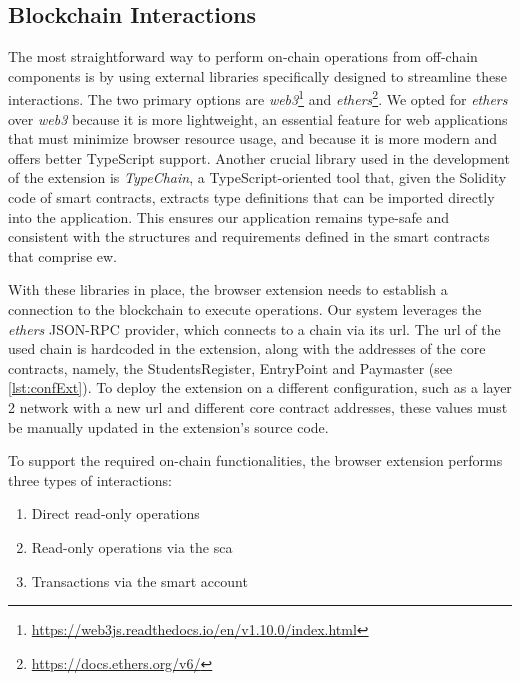 \subsection{Blockchain Interactions}
\label{ssec:extBlockchainInteraction}
The most straightforward way to perform on-chain operations from off-chain components is by using external libraries specifically designed to streamline these interactions. The two primary options are \textit{web3}\footnote{\url{https://web3js.readthedocs.io/en/v1.10.0/index.html}} and \textit{ethers}\footnote{\url{https://docs.ethers.org/v6/}}. We opted for \textit{ethers} over \textit{web3} because it is more lightweight, an essential feature for web applications that must minimize browser resource usage, and because it is more modern and offers better TypeScript support. 
Another crucial library used in the development of the extension is \textit{TypeChain}, a TypeScript-oriented tool that, given the Solidity code of smart contracts, extracts type definitions that can be imported directly into the application. This ensures our application remains type-safe and consistent with the structures and requirements defined in the smart contracts that comprise \acrlong{ew}. 

With these libraries in place, the browser extension needs to establish a connection to the blockchain to execute operations. Our system leverages the \textit{ethers} JSON-RPC provider, which connects to a chain via its \acrshort{url}. The \acrshort{url} of the used chain is hardcoded in the extension, along with the addresses of the core contracts, namely, the StudentsRegister, EntryPoint and Paymaster (see \cref{lst:confExt}). To deploy the extension on a different configuration, such as a layer 2 network with a new \acrshort{url} and different core contract addresses, these values must be manually updated in the extension's source code.



To support the required on-chain functionalities, the browser extension performs three types of interactions:
\begin{enumerate}
    \item Direct read-only operations
    \item Read-only operations via the \acrlong{sca}
    \item Transactions via the smart account
\end{enumerate}

